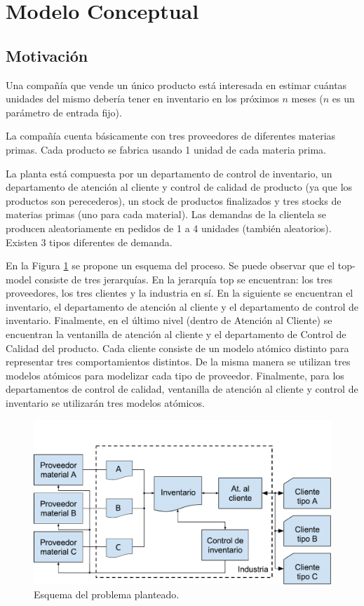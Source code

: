 \documentclass[10pt]{article}
\begin{document}
\section{Modelo Conceptual}
\subsection{Motivación}

Una compañía que vende un único producto está interesada en estimar cuántas unidades del mismo debería tener en inventario en los próximos $n$ meses ($n$ es un parámetro de entrada fijo).

La compañía cuenta básicamente con tres proveedores de diferentes materias primas. Cada producto se fabrica usando 1 unidad de cada materia prima.

La planta está compuesta por un departamento de control de inventario, un departamento de atención al cliente y control de calidad de producto (ya que los productos son perecederos), un stock de productos finalizados y tres stocks de materias primas (uno para cada material). Las demandas de la clientela se producen aleatoriamente en pedidos de 1 a 4 unidades (también aleatorios). Existen 3 tipos diferentes de demanda.

En la Figura \ref{fig:esquema-del-problema} se propone un esquema del proceso. Se puede observar que el top-model consiste de tres jerarquías. En la jerarquía top se encuentran: los tres proveedores, los tres clientes y la industria en sí. En la siguiente se encuentran el inventario, el departamento de atención al cliente y el departamento de control de inventario. Finalmente, en el último nivel (dentro de Atención al Cliente) se encuentran la ventanilla de atención al cliente y el departamento de Control de Calidad del producto.
Cada cliente consiste de un modelo atómico distinto para representar tres comportamientos distintos. De la misma manera se utilizan tres modelos atómicos para modelizar cada tipo de proveedor. Finalmente, para los departamentos de control de calidad, ventanilla de atención al cliente y control de inventario se utilizarán tres modelos atómicos.

\begin{figure}[h]
\centering
\includegraphics[width=\textwidth]{img/figura1}
\caption{Esquema del problema planteado.}
\label{fig:esquema-del-problema}
\end{figure}
\end{document}
